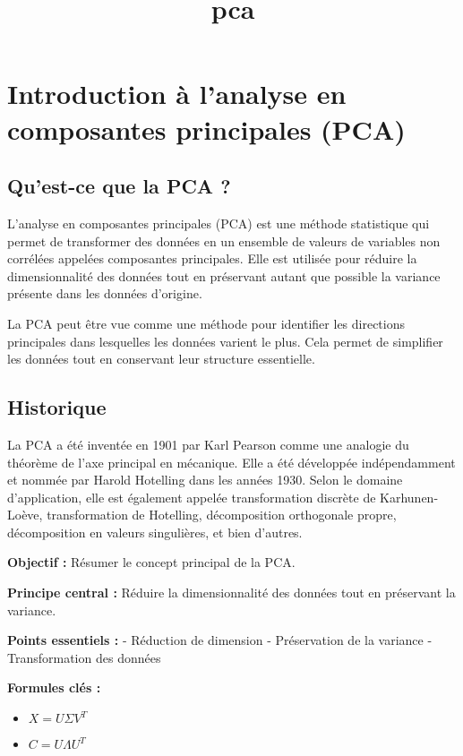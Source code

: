 \documentclass[12pt]{article}
\title{pca}
\author{}
\date{}
\begin{document}
\maketitle
\tableofcontents
\newpage

\section{Introduction à l'analyse en composantes principales (PCA)}

\subsection{Qu'est-ce que la PCA ?}

L'analyse en composantes principales (PCA) est une méthode statistique qui permet de transformer des données en un ensemble de valeurs de variables non corrélées appelées composantes principales. Elle est utilisée pour réduire la dimensionnalité des données tout en préservant autant que possible la variance présente dans les données d'origine.

\begin{tcolorbox}[title={Intuition}]
La PCA peut être vue comme une méthode pour identifier les directions principales dans lesquelles les données varient le plus. Cela permet de simplifier les données tout en conservant leur structure essentielle.
\end{tcolorbox}

\subsection{Historique}

La PCA a été inventée en 1901 par Karl Pearson comme une analogie du théorème de l'axe principal en mécanique. Elle a été développée indépendamment et nommée par Harold Hotelling dans les années 1930. Selon le domaine d'application, elle est également appelée transformation discrète de Karhunen-Loève, transformation de Hotelling, décomposition orthogonale propre, décomposition en valeurs singulières, et bien d'autres.

\begin{tcolorbox}[colback=red!5!white, colframe=red!75!black, title={\faBookmark\hspace{0.5em}Fiche Récapitulative}]
  
\textbf{Objectif :} Résumer le concept principal de la PCA.

\textbf{Principe central :} Réduire la dimensionnalité des données tout en préservant la variance.

\vspace{0.4em}
\textbf{Points essentiels :}  
- Réduction de dimension
- Préservation de la variance
- Transformation des données

\vspace{0.4em}
\textbf{Formules clés :}  
\begin{itemize}
\item $X = U \Sigma V^T$
\item $C = U \Lambda U^T$
\end{itemize}
  
\end{tcolorbox}
\end{document}

